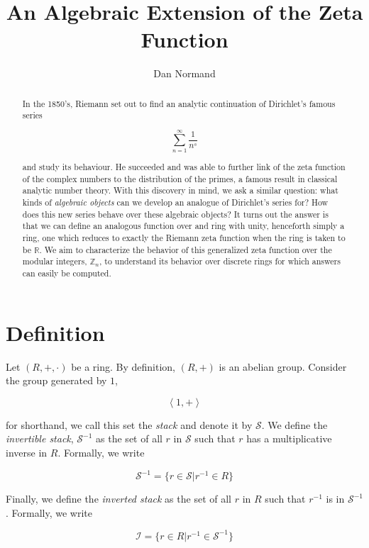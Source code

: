 \documentclass{amsart}
\title{An Algebraic Extension of the Zeta Function}
\author{Dan Normand}
\date{}
\begin{document}
\maketitle

\begin{abstract}

In the 1850's, Riemann set out to find an analytic continuation of Dirichlet's famous series

\[\sum_{n=1}^{\infty}\frac{1}{n^s}\]

and study its behaviour. He succeeded and was able to further link of the zeta function of the complex numbers to the distribution of the primes, a famous result in classical analytic number theory. With this discovery in mind, we ask a similar question: what kinds of \textit{algebraic objects} can we develop an analogue of Dirichlet's series for? How does this new series behave over these algebraic objects? It turns out the answer is that we can define an analogous function over and ring with unity, henceforth simply a ring, one which reduces to exactly the Riemann zeta function when the ring is taken to be \(\mathbb{R}\). We aim to characterize the behavior of this generalized zeta function over the modular integers, \(\mathbb{Z}_n\), to understand its behavior over discrete rings for which answers can easily be computed.

\end{abstract}

\section{Definition}

Let \((R,+,\cdot)\) be a ring. By definition, \((R,+)\) is an abelian group. Consider the group generated by \(1\),

\[\left<1,+\right>\]

for shorthand, we call this set the \textit{stack} and denote it by \(\mathcal{S}\). We define the \textit{invertible stack}, \(\mathcal{S}^{-1}\) as the set of all \(r\) in \(\mathcal{S}\) such that \(r\) has a multiplicative inverse in \(R\). Formally, we write

\[\mathcal{S}^{-1}=\{r\in\mathcal{S}|r^{-1}\in R\}\]

Finally, we define the \textit{inverted stack} as the set of all \(r\) in \(R\) such that \(r^{-1}\) is in \(\mathcal{S}^{-1}\). Formally, we write

\[\mathcal{I}=\{r\in R|r^{-1}\in\mathcal{S}^{-1}\}\]
\end{document}

